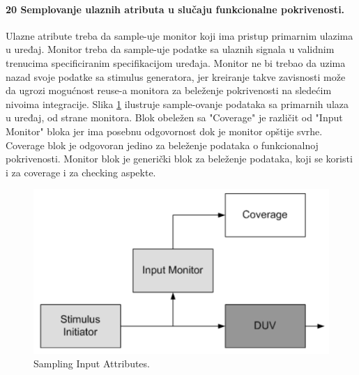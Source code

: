 \documentclass[a4paper, 12pt]{article}
\begin{document}
\paragraph{20 Semplovanje ulaznih atributa u slučaju funkcionalne pokrivenosti.}
\hfill \break
\indent Ulazne atribute treba da sample-uje monitor koji ima pristup primarnim ulazima u uređaj. Monitor treba da sample-uje podatke sa ulaznih signala u validnim trenucima specificiranim specifikacijom uređaja. Monitor ne bi trebao da uzima nazad svoje podatke sa stimulus generatora, jer kreiranje takve zavisnosti može da ugrozi mogućnost reuse-a monitora za beleženje pokrivenosti na sledećim nivoima integracije. Slika \ref{img-sampling-input-attributes} ilustruje sample-ovanje podataka sa primarnih ulaza u uređaj, od strane monitora. Blok obeležen sa "Coverage" je različit od "Input Monitor" bloka jer ima posebnu odgovornost dok je monitor opštije svrhe. Coverage blok je odgovoran jedino za beleženje podataka o funkcionalnoj pokrivenosti. Monitor blok je generički blok za beleženje podataka, koji se koristi i za coverage i za checking aspekte.
\begin{figure}[h!]
\centering
\includegraphics[scale=0.5]{img-sampling-input-attributes.png}
\caption{Sampling Input Attributes.}
\label{img-sampling-input-attributes}
\end{figure}
\end{document}
